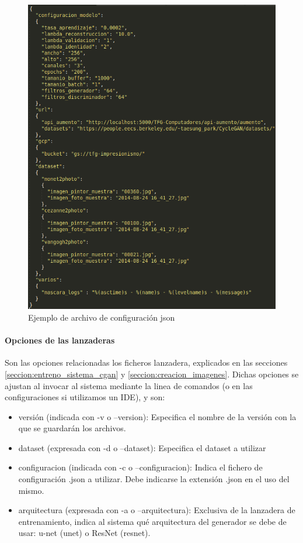 \documentclass[../main.tex]{subfiles}
\begin{document}
    \begin{figure}[h!]
            \centering
            \includegraphics[width=1\textwidth]{imagenes/ejemplo_json.png}
            \caption{Ejemplo de archivo de configuración json}
            \label{fig:ejemplo_json}
    \end{figure}
    
    \paragraph{Opciones de las lanzaderas}
    Son las opciones relacionadas los ficheros lanzadera, explicados en las secciones \ref{seccion:entreno_sistema_cgan} y \ref{seccion:creacion_imagenes}. Dichas opciones se ajustan al invocar al sistema mediante la linea de comandos (o en las configuraciones si utilizamos un IDE), y son:
    \begin{itemize}
        \item versión (indicada con -v o --version): Especifica el nombre de la versión con la que se guardarán los archivos.
        \item dataset (expresada con -d o --dataset): Especifica el dataset a utilizar
        \item configuracion (indicada con -c o --configuracion): Indica el fichero de configuración .json a utilizar. Debe indicarse la extensión .json en el uso del mismo.
        \item arquitectura (expresada con -a o --arquitectura): Exclusiva de la lanzadera de entrenamiento, indica al sistema qué arquitectura del generador se debe de usar: u-net (unet) o ResNet (resnet).
    \end{itemize}
\end{document}
